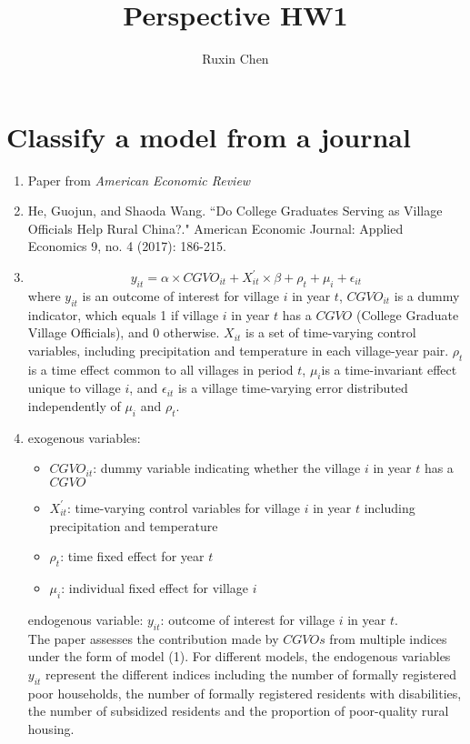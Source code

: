 \documentclass[12pt]{article}
\title{Perspective HW1}
\author{Ruxin Chen}
\date{}
\begin{document}
\maketitle

\section{Classify a model from a journal}
\begin{enumerate}[label={\alph*)}]
    \item Paper from \emph{American Economic Review}
    \item He, Guojun, and Shaoda Wang. ``Do College Graduates Serving as Village Officials Help Rural China?." American Economic Journal: Applied Economics 9, no. 4 (2017): 186-215.
    \item { 
    \begin{equation}
        y_{it} = \alpha \times CGVO_{it} + X_{it}^{'} \times \beta + \rho_{t} + \mu_i + \epsilon_{it}
    \end{equation}
where $y_{it}$ is an outcome of interest for village $i$ in year $t$, $CGVO_{it}$ is a dummy indicator, which equals 1 if village $i$ in year $t$ has a $CGVO$ (College Graduate Village Officials), and 0 otherwise. $X_{it}$ is a set of time-varying control variables, including precipitation and temperature in each village-year pair. $\rho_t$ is a time effect common to all villages in period $t$, $\mu_i$is a time-invariant effect unique to village $i$, and $\epsilon_{it}$ is a village time-varying error distributed independently of $\mu_i$ and $\rho_t$.}
\item exogenous variables: 
\begin{itemize}
    \item $CGVO_{it}$: dummy variable indicating whether the village $i$ in year $t$ has a $CGVO$
    \item $X_{it}^{'}$: time-varying control variables for village $i$ in year $t$ including precipitation and temperature  
    \item $\rho_{t}$: time fixed effect for year $t$
    \item $\mu_i$: individual fixed effect for village $i$
\end{itemize}
endogenous variable: $y_{it}$: outcome of interest for village $i$ in year $t$. \\
The paper assesses the contribution made by $CGVOs$ from multiple indices under the form of model (1). For different models, the endogenous variables $y_{it}$ represent the different indices including the number of formally registered poor households, the number of formally registered residents with disabilities, the number of subsidized residents and the proportion of poor-quality rural housing.


\end{enumerate}
\end{document}

